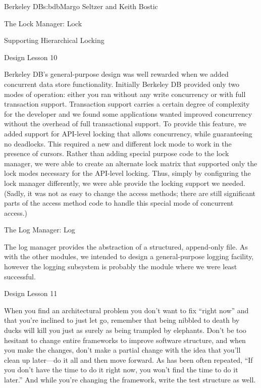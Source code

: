 \begin{aosachapter}{Berkeley DB}{s:bdb}{Margo Seltzer and Keith Bostic}
\begin{aosasect1}{The Lock Manager: Lock}
\begin{aosasect2}{Supporting Hierarchical Locking}
\begin{aosabox}{Design Lesson 10}

Berkeley DB's general-purpose design was well rewarded when we added
concurrent data store functionality. Initially Berkeley
DB provided only two modes of operation: either you ran without any
write concurrency or with full transaction support. Transaction
support carries a certain degree of complexity for the developer and
we found some applications wanted improved concurrency without the
overhead of full transactional support. To provide this feature, we
added support for API-level locking that allows concurrency, while
guaranteeing no deadlocks.  This required a new and different lock
mode to work in the presence of cursors. Rather than adding special
purpose code to the lock manager, we were able to create an alternate
lock matrix that supported only the lock modes necessary for the
API-level locking.  Thus, simply by configuring the lock manager
differently, we were able provide the locking support we
needed. (Sadly, it was not as easy to change the access methods; there
are still significant parts of the access method code to handle this
special mode of concurrent access.)

\end{aosabox}

\end{aosasect2}

\end{aosasect1}

\begin{aosasect1}{The Log Manager: Log}
\label{sec.bdb.log}

The log manager provides the abstraction of a structured, append-only
file. As with the other modules, we intended to design a
general-purpose logging facility, however the logging subsystem is
probably the module where we were least successful. 

\begin{aosabox}{Design Lesson 11}

When you find an architectural problem you don't want to fix ``right
now'' and that you're inclined to just let go, remember that being
nibbled to death by ducks will kill you just as surely as being
trampled by elephants. Don't be too hesitant to change entire
frameworks to improve software structure, and when you make the
changes, don't make a partial change with the idea that you'll clean
up later---do it all and then move forward. As has been often
repeated, ``If you don't have the time to do it right now, you won't
find the time to do it later.'' And while you're changing the
framework, write the test structure as well.


\end{aosabox}
\end{aosasect1}
\end{aosachapter}
